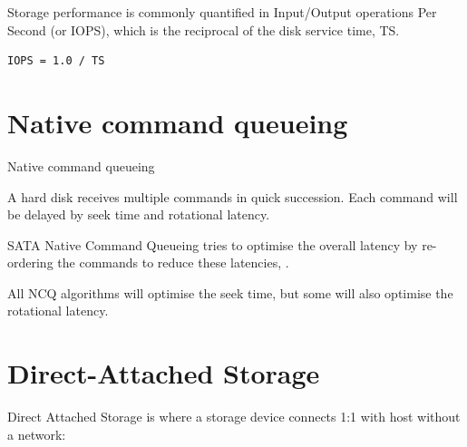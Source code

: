 Storage performance is commonly quantified in Input/Output operations
Per Second (or IOPS), which is the reciprocal of the disk service time,
TS.

\begin{verbatim}
IOPS = 1.0 / TS
\end{verbatim}

\section{Native command queueing}\label{native-command-queueing}


Native command queueing

A hard disk receives multiple commands in quick succession. Each command
will be delayed by seek time and rotational latency.

SATA Native Command Queueing tries to optimise the overall latency by
re-ordering the commands to reduce these latencies, .

All NCQ algorithms will optimise the seek time, but some will also
optimise the rotational latency.

\section{Direct-Attached Storage}\label{direct-attached-storage}

Direct Attached Storage is where a storage device connects 1:1 with host
without a network:

